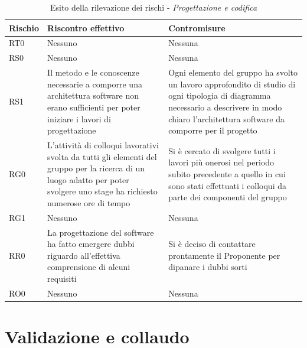 \documentclass[./PianodiProgetto.tex]{subfiles}
\begin{document}
\begin{longtable}{|p{15mm}|p{60mm}|p{60mm}|}
	\caption{Esito della rilevazione dei rischi - \textit{Progettazione e codifica}} \\
	\hline \textbf{Rischio} & \textbf{Riscontro effettivo} & \textbf{Contromisure} \\
	
	\hline RT0 & Nessuno & Nessuna \\
	
	\hline RS0 & Nessuno & Nessuna \\
	
	\hline RS1 & Il metodo e le conoscenze necessarie a comporre una architettura software non erano sufficienti per poter iniziare i lavori di progettazione & Ogni elemento del gruppo ha svolto un lavoro approfondito di studio di ogni tipologia di diagramma necessario a descrivere in modo chiaro l'architettura software da comporre per il progetto \\
	
	\hline RG0 & L'attività di colloqui lavorativi svolta da tutti gli elementi del gruppo per la ricerca di un luogo adatto per poter svolgere uno stage ha richiesto numerose ore di tempo & Si è cercato di svolgere tutti i lavori più onerosi nel periodo subito precedente a quello in cui sono stati effettuati i colloqui da parte dei componenti del gruppo \\
	
	\hline RG1 & Nessuno & Nessuna \\
	
	\hline RR0 & La progettazione del software ha fatto emergere dubbi riguardo all'effettiva comprensione di alcuni requisiti & Si è deciso di contattare prontamente il Proponente per dipanare i dubbi sorti \\
	
	\hline RO0 & Nessuno & Nessuna \\
	
	\hline
\end{longtable}

\section{Validazione e collaudo}

\setlength\LTleft{-5.5mm}
\end{document}
